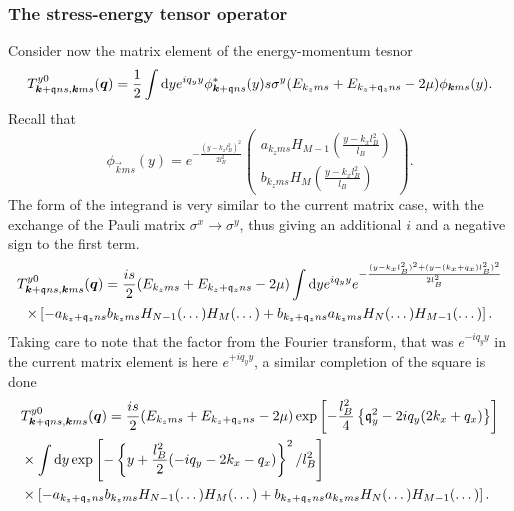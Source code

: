 \subsubsection{The stress-energy tensor operator}
Consider now the matrix element of the energy-momentum tesnor
\begin{equation}
\label{eq:75}
T^{y 0}_{\bm{k}+\mathfrak{q}ns, \bm{k}ms} (\bm{q})
=
\frac{1}{2}
\int \mathrm{d}y e^{iq_y y}
\phi ^* _{\bm{k}+\mathfrak{q} ns}(y) s \sigma ^y (E_{k_z m s} + E_{k_z+\mathfrak{q}_z n s}- 2\mu )
\phi _{\bm{k} ms}(y).
\end{equation}
Recall that 
\begin{equation}
  \phi _{\vec{k}ms}(y) =
  e^{- \frac{(y - k_x l_B ^2)^2}{2 l_B^2}}
  \begin{pmatrix}
    a_{k_z ms} H_{M-1} \left( \frac{y-k_x l_B^2}{l_B} \right)\\
    b_{k_z ms} H_M \left( \frac{y - k_x l_B^2}{l_B} \right)
  \end{pmatrix}.
\end{equation}
The form of the integrand is very similar to the current matrix case, with the exchange of the Pauli matrix $\sigma ^x \to \sigma ^y$, thus giving an additional $i$ and a negative sign to the first term.
{
\setlength\multlinegap{0pt}  %
\begin{multline}
T^{y 0}_{\bm{k}+\mathfrak{q}ns, \bm{k}ms} (\bm{q})
  = \frac{i s}{2}
    (E_{k_z m s} + E_{k_z+\mathfrak{q}_z n s}- 2\mu )
    \int \mathrm{d}y e^{iq_y y} e^{- \frac{(y-k_xl_B^2)^2 + (y-(k_x + q_x) l_B^2)^2}{2 l_B^2}}\\
    \times \left[
    - a_{k_z+\mathfrak{q}_z ns} b_{k_z ms} H_{N-1} (\dots ) H_M(\dots )
    + b_{k_z+\mathfrak{q}_z ns} a_{k_zms} H_N(\dots ) H_{M-1}(\dots )
    \right].
\end{multline}
}
Taking care to note that the factor from the Fourier transform, that was $e^{-iq_y y}$ in the current matrix element is here $e^{+ i q_y y}$, a similar completion of the square is done
\begin{equation}
  \begin{split}
    &T^{y 0}_{\bm{k}+\mathfrak{q}ns, \bm{k}ms} (\bm{q}) =
    \frac{i s}{2}
    (E_{k_z m s} + E_{k_z+\mathfrak{q}_z n s}- 2\mu )
    \exp \left[
      -\frac{l_B^2}{4} \left\{ \mathfrak{q}_y^2 - 2 i q_y (2 k_x + q_x) \right\}
    \right]\\
    &\times \int \mathrm{d}y
    \exp \left[
      -\left\{ y + \frac{l_B^2}{2} (-iq_y - 2 k_x - q_x) \right\}^2 / l_B^2
    \right]\\
    &\times \left[
      - a_{k_z+\mathfrak{q}_z ns} b_{k_z ms} H_{N-1} (\dots ) H_M(\dots )
      + b_{k_z+\mathfrak{q}_z ns} a_{k_zms} H_N(\dots ) H_{M-1}(\dots )
    \right].
  \end{split}
\end{equation}
